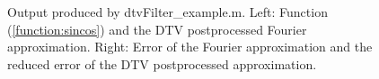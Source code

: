 \documentclass[12pt]{article}
\begin{document}
\begin{figure}[tbh]
   \centering
 \caption{Output produced by dtvFilter\_example.m. Left: Function (\ref{function:sincos}) and the DTV postprocessed Fourier approximation.  Right: Error of the Fourier approximation and the
 reduced error of the DTV postprocessed approximation.
          } \label{fig:dtvFilter}
\end{figure}
\end{document}
